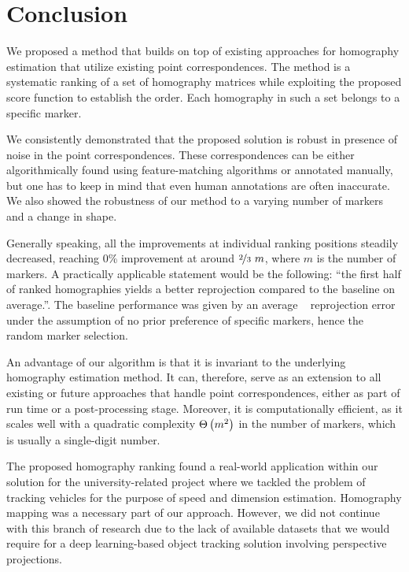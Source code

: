 \section{Conclusion}

We proposed a method that builds on top of existing approaches for homography estimation that utilize existing point correspondences. The method is a systematic ranking of a set of homography matrices while exploiting the proposed score function to establish the order. Each homography in such a set belongs to a specific marker.

We consistently demonstrated that the proposed solution is robust in presence of noise in the point correspondences. These correspondences can be either algorithmically found using feature-matching algorithms or annotated manually, but one has to keep in mind that even human annotations are often inaccurate. We also showed the robustness of our method to a varying number of markers and a change in shape.

Generally speaking, all the improvements at individual ranking positions steadily decreased, reaching $0$\% improvement at around $\nicefrac{2}{3}~m$, where $m$ is the number of markers. A practically applicable statement would be the following: ``the first half of ranked homographies yields a better reprojection compared to the baseline on average.''. The baseline performance was given by an average \opencv{}~\cite{bradski2008learning} reprojection error under the assumption of no prior preference of specific markers, hence the random marker selection.

An advantage of our algorithm is that it is invariant to the underlying homography estimation method. It can, therefore, serve as an extension to all existing or future approaches that handle point correspondences, either as part of run time or a post-processing stage. Moreover, it is computationally efficient, as it scales well with a quadratic complexity ${\Theta} \left( m^2 \right)$ in the number of markers, which is usually a single-digit number.

The proposed homography ranking found a real-world application within our solution for the university-related \interreg{} project where we tackled the problem of tracking vehicles for the purpose of speed and dimension estimation. Homography mapping was a necessary part of our approach. However, we did not continue with this branch of research due to the lack of available datasets that we would require for a deep learning-based object tracking solution involving perspective projections.
